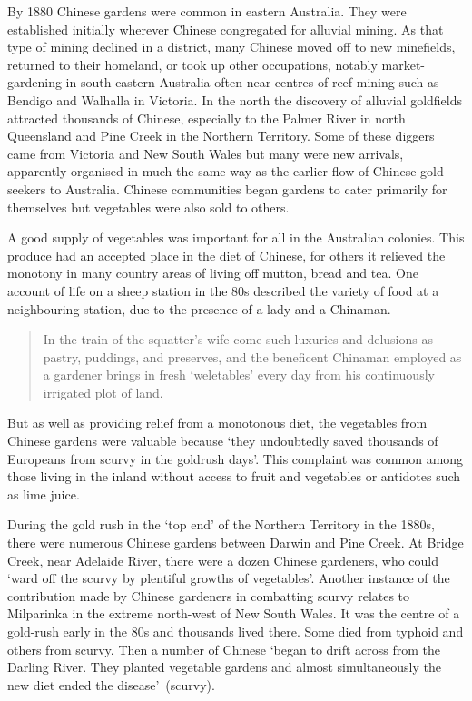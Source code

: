 By 1880 Chinese gardens were common in eastern Australia.  They were
established initially wherever Chinese congregated for alluvial
mining.  As that type of mining declined in a district, many Chinese
moved off to new minefields, returned to their homeland, or took up
other occupations, notably market-gardening in south-eastern Australia
often near centres of reef mining such as Bendigo and Walhalla in
Victoria.  In the north the discovery of alluvial goldfields attracted
thousands of Chinese, especially to the Palmer River in north
Queensland and Pine Creek in the Northern Territory.  Some of these
diggers came from Victoria and New South Wales but many were new
arrivals, apparently organised in much the same way as the earlier
flow of Chinese gold-seekers to Australia.  Chinese communities began
gardens to cater primarily for themselves but vegetables were also
sold to others.

A good supply of vegetables was important for all in the Australian
colonies.  This produce had an accepted place in the diet of Chinese,
for others it relieved the monotony in many country areas of living
off mutton, bread and tea.  One account of life on a sheep station in
the 80s described the variety of food at a neighbouring station, due
to the presence of a lady and a Chinaman.
\begin{quote}
	In the train of the squatter's wife come such luxuries and
	delusions as pastry, puddings, and preserves, and the
	beneficent Chinaman employed as a gardener brings in fresh
	`weletables' every day from his continuously irrigated plot of
	land.
\end{quote}
But as well as providing relief from a monotonous diet, the vegetables
from Chinese gardens were valuable because `they undoubtedly saved
thousands of Europeans from scurvy in the goldrush days'.  This complaint was
common among those living in the inland without access to fruit and
vegetables or antidotes such as lime juice.

During the gold rush in the `top end' of the Northern Territory in the
1880s, there were numerous Chinese gardens between Darwin and Pine
Creek.  At Bridge Creek, near Adelaide River, there were a dozen
Chinese gardeners, who could `ward off the scurvy by plentiful growths
of vegetables'.  Another instance of the contribution made by
Chinese gardeners in combatting scurvy relates to Milparinka in the
extreme north-west of New South Wales.  It was the centre of a
gold-rush early in the 80s and thousands lived there.  Some died from
typhoid and others from scurvy.  Then a number of Chinese `began to
drift across from the Darling River. They planted vegetable gardens
and almost simultaneously the new diet ended the
disease'~(scurvy).

